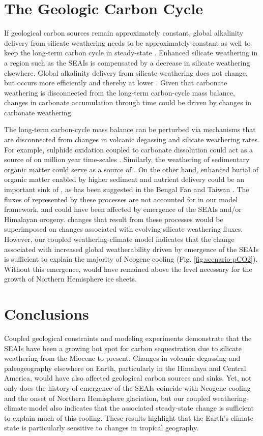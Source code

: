 \section{The Geologic Carbon Cycle}

If geological carbon sources remain approximately constant, global alkalinity delivery from silicate weathering needs to be approximately constant as well to keep the long-term carbon cycle in steady-state \citep{Kump1997a}. Enhanced silicate weathering in a region such as the SEAIs is compensated by a decrease in silicate weathering elsewhere. Global alkalinity delivery from silicate weathering does not change, but occurs more efficiently and thereby at lower \pCOtwo. Given that carbonate weathering is disconnected from the long-term carbon-cycle mass balance, changes in carbonate accumulation through time \citep{Si2019a} could be driven by changes in carbonate weathering.

The long-term carbon-cycle mass balance can be perturbed via mechanisms that are disconnected from changes in volcanic degassing and silicate weathering rates. For example, sulphide oxidation coupled to carbonate dissolution could act as a source of \COtwo on million year time-scales \citep{Torres2014a}. Similarly, the weathering of sedimentary organic matter could serve as a source of \COtwo \citep{Hilton2014a}. On the other hand, enhanced burial of organic matter enabled by higher sediment and nutrient delivery could be an important sink of \COtwo, as has been suggested in the Bengal Fan \citep{Galy2007a} and Taiwan \citep{Kao2014a}. The fluxes of \COtwo represented by these processes are not accounted for in our model framework, and could have been affected by emergence of the SEAIs and/or Himalayan orogeny. \pCOtwo changes that result from these processes would be superimposed on \pCOtwo changes associated with evolving silicate weathering fluxes. However, our coupled weathering-climate model indicates that the \pCOtwo change associated with increased global weatherability driven by emergence of the SEAIs is sufficient to explain the majority of Neogene cooling (Fig. \ref{fig:scenario-pCO2}). Without this emergence, \pCOtwo would have remained above the level necessary for the growth of Northern Hemisphere ice sheets.

\section{Conclusions}

Coupled geological constraints and modeling experiments demonstrate that the SEAIs have been a growing hot spot for carbon sequestration due to silicate weathering from the Miocene to present. Changes in volcanic degassing and paleogeography elsewhere on Earth, particularly in the Himalaya and Central America, would have also affected geological carbon sources and sinks. Yet, not only does the history of emergence of the SEAIs coincide with Neogene cooling and the onset of Northern Hemisphere glaciation, but our coupled weathering-climate model also indicates that the associated steady-state \pCOtwo change is sufficient to explain much of this cooling. These results highlight that the Earth's climate state is particularly sensitive to changes in tropical geography.

